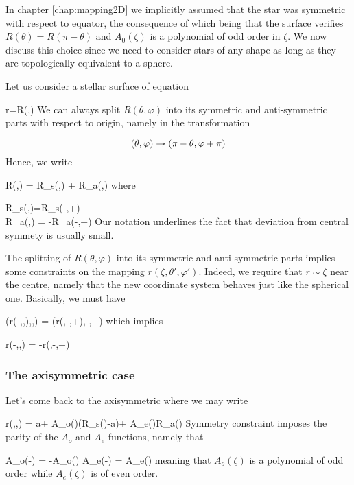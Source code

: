In chapter \ref{chap:mapping2D} we implicitly assumed that the star was
symmetric with respect to equator, the consequence of which  being that
the surface verifies $R(\theta)=R(\pi-\theta)$ and $A_0(\zeta)$ is a
polynomial of odd order in $\zeta$. We now discuss this choice since we
need to consider stars of any shape as long as they are topologically
equivalent to a sphere.

Let us consider a stellar surface of equation

\beq r=R(\theta,\varphi)\eeq
We can always split $R(\theta,\varphi)$ into its symmetric and
anti-symmetric parts with respect to origin, namely in the
transformation

\[ (\theta,\varphi) \rightarrow (\pi-\theta,\varphi+\pi)\]
Hence, we write

\beq R(\theta,\varphi) = R_s(\theta,\varphi) + \delta R_a(\theta,\varphi)
\eeq
where

\greq
R_s(\theta,\varphi)=R_s(\pi-\theta,\varphi+\pi) \\
\delta R_a(\theta,\varphi) = -\delta R_a(\pi-\theta,\varphi+\pi)
\egreq
Our notation underlines the fact that deviation from central symmety is
usually small.

The splitting of $R(\theta,\varphi)$ into its symmetric and
anti-symmetric parts implies some constraints on the mapping
$r(\zeta,\theta',\varphi')$. Indeed, we require that $r\sim\zeta$ near
the centre, namely that the new coordinate system behaves just like the
spherical one. Basically, we must have

\beq \vr(r(-\zeta,\theta,\varphi),\theta,\varphi) =
\vr(r(\zeta,\pi-\theta,\varphi+\pi),\pi-\theta,\varphi+\pi) \eeq
which implies

\beq r(-\zeta,\theta,\varphi) = -r(\zeta,\pi-\theta,\varphi+\pi) 

\subsubsection{The axisymmetric case}

Let's come back to the axisymmetric where we may write

\beq r(\zeta,\theta,\varphi) = a\zeta + A_o(\zeta)(R_s(\theta)-a)+
A_e(\zeta)\delta R_a(\theta)
Symmetry constraint  imposes the parity of the $A_o$ and $A_e$
functions, namely that

\beq A_o(-\zeta) = -A_o(\zeta) \andet A_e(-\zeta) = A_e(\zeta) \eeq
meaning that $A_o(\zeta)$ is a polynomial of odd order while $A_e(\zeta)$
is of even order.

